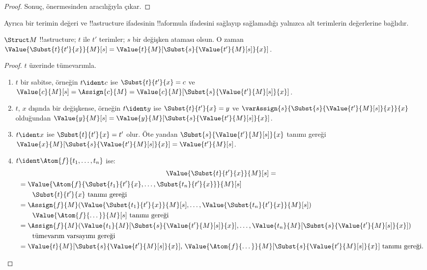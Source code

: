 \begin{proof}
Sonuç,  önermesinden
 aracılığıyla çıkar.
\end{proof}

Ayrıca bir terimin değeri ve !!a{structure} ifadesinin !!a{formula}
ifadesini sağlayıp sağlamadığı yalnızca alt terimlerin değerlerine
bağlıdır.

\begin{prop}
$\Struct M$ !!a{structure}; $t$ ile $t'$ terimler; $s$ bir değişken
ataması olsun. O zaman
$\Value{\Subst{t}{t'}{x}}{M}[s]=
\Value{t}{M}[\Subst{s}{\Value{t'}{M}[s]}{x}]$.
\end{prop}

\begin{proof}
$t$ üzerinde tümevarımla.
\begin{enumerate}
\item $t$ bir sabitse, örneğin $t\ident c$ ise
  $\Subst{t}{t'}{x}=c$ ve
  $\Value{c}{M}[s]=\Assign{c}{M}=
  \Value{c}{M}[\Subst{s}{\Value{t'}{M}[s]}{x}]$.

\item $t$, $x$ dışında bir değişkense, örneğin $t\ident y$ ise
  $\Subst{t}{t'}{x}=y$ ve
  $\varAssign{s}{\Subst{s}{\Value{t'}{M}[s]}{x}}{x}$ olduğundan
  $\Value{y}{M}[s]=
  \Value{y}{M}[\Subst{s}{\Value{t'}{M}[s]}{x}]$.

\item $t\ident x$ ise $\Subst{t}{t'}{x}=t'$ olur. Öte yandan
  $\Subst{s}{\Value{t'}{M}[s]}{x}$ tanımı gereği
  $\Value{x}{M}[\Subst{s}{\Value{t'}{M}[s]}{x}]
  =\Value{t'}{M}[s]$.

\item $t\ident\Atom{f}{t_1,\dots,t_n}$ ise:
\begin{multline*}
  \Value{\Subst{t}{t'}{x}}{M}[s]  = \\
  \begin{aligned}[b]
& = \Value{\Atom{f}{\Subst{t_1}{t'}{x}, \dots, \Subst{t_n}{t'}{x}}}{M}[s]\\
& \qquad    \text{$\Subst{t}{t'}{x}$ tanımı gereği}\\
& = \Assign{f}{M}(\Value{\Subst{t_1}{t'}{x}}{M}[s], \dots,
    \Value{\Subst{t_n}{t'}{x}}{M}[s])\\
& \qquad  \text{$\Value{\Atom{f}{\dots}}{M}[s]$ tanımı gereği}\\
& = \Assign{f}{M}(\Value{t_1}{M}[\Subst{s}{\Value{t'}{M}[s]}{x}], \dots,
   \Value{t_n}{M}[\Subst{s}{\Value{t'}{M}[s]}{x}])\\
& \qquad    \text{tümevarım varsayımı gereği}\\
& = \Value{t}{M}[\Subst{s}{\Value{t'}{M}[s]}{x}]
    \text{, $\Value{\Atom{f}{\dots}}{M}[\Subst{s}{\Value{t'}{M}[s]}{x}]$ tanımı gereği.}
  \end{aligned}
\end{multline*}
\end{enumerate}
\end{proof}


